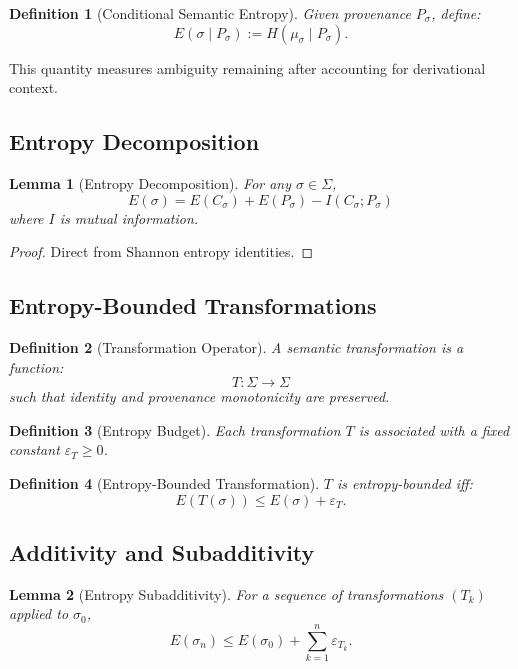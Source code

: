\documentclass[11pt]{article}
\newtheorem{definition}{Definition}
\newtheorem{lemma}{Lemma}
\begin{document}
\begin{definition}[Conditional Semantic Entropy]
Given provenance $P_\sigma$, define:
\[
E(\sigma \mid P_\sigma) := H(\mu_\sigma \mid P_\sigma).
\]
\end{definition}

This quantity measures ambiguity remaining after accounting for derivational context.

\subsection{Entropy Decomposition}

\begin{lemma}[Entropy Decomposition]
For any $\sigma \in \Sigma$,
\[
E(\sigma) = E(C_\sigma) + E(P_\sigma) - I(C_\sigma; P_\sigma)
\]
where $I$ is mutual information.
\end{lemma}

\begin{proof}
Direct from Shannon entropy identities.
\end{proof}

\subsection{Entropy-Bounded Transformations}

\begin{definition}[Transformation Operator]
A semantic transformation is a function:
\[
T : \Sigma \to \Sigma
\]
such that identity and provenance monotonicity are preserved.
\end{definition}

\begin{definition}[Entropy Budget]
Each transformation $T$ is associated with a fixed constant $\varepsilon_T \ge 0$.
\end{definition}

\begin{definition}[Entropy-Bounded Transformation]
$T$ is entropy-bounded iff:
\[
E(T(\sigma)) \le E(\sigma) + \varepsilon_T.
\]
\end{definition}

\subsection{Additivity and Subadditivity}

\begin{lemma}[Entropy Subadditivity]
For a sequence of transformations $(T_k)$ applied to $\sigma_0$,
\[
E(\sigma_n) \le E(\sigma_0) + \sum_{k=1}^n \varepsilon_{T_k}.
\]
\end{lemma}
\end{document}

